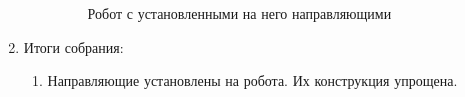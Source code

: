 \begin{enumerate}
\begin{enumerate}
\begin{figure}[H]
\begin{minipage}[h]{0.47\linewidth}
      	\end{minipage}
      	\caption{Робот с установленными на него направляющими}
      \end{figure}
      
    \end{enumerate}
    
	\item Итоги собрания: 
	\begin{enumerate}
	  \item  Направляющие установлены на робота. Их конструкция упрощена.
	  

\end{enumerate}
\end{enumerate}
